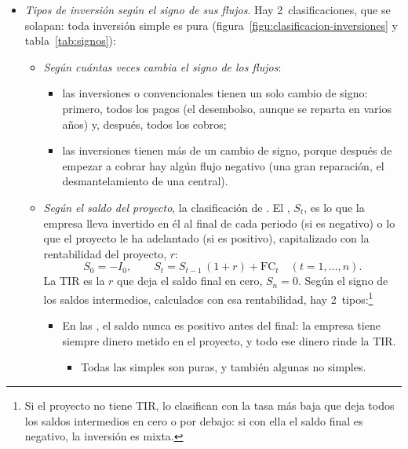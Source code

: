 \documentclass[11pt]{article}
\begin{document}
\begin{infografia}[H]
\centering
\caption{Esquema de pagos de un proyecto de inversión}\label{figu:esquema-pagos}
\end{infografia}

\begin{itemize}
\item \emph{Tipos de inversión según el signo de sus flujos}. Hay 2~clasificaciones, que se solapan: toda inversión simple es pura (figura~\ref{figu:clasificacion-inversiones} y tabla~\ref{tab:signos}):
  \begin{itemize}
  \item \emph{Según cuántas veces cambia el signo de los flujos}:
    \begin{itemize}
    \item las inversiones  o convencionales tienen un solo cambio de signo: primero, todos los pagos (el desembolso, aunque se reparta en varios años) y, después, todos los cobros;
    \item las inversiones  tienen más de un cambio de signo, porque después de empezar a cobrar hay algún flujo negativo (una gran reparación, el desmantelamiento de una central).
    \end{itemize}
  \item \emph{Según el saldo del proyecto}, la clasificación de \textcite{TeichroewRobichekMontalbano1965Analysis}. El , $S_t$, es lo que la empresa lleva invertido en él al final de cada periodo (si es negativo) o lo que el proyecto le ha adelantado (si es positivo), capitalizado con la rentabilidad del proyecto, $r$:
    \[
    S_0=-I_0,\qquad S_t=S_{t-1}\,(1+r)+\mathrm{FC}_t\quad(t=1,\dots,n).
    \]
    La TIR es la $r$ que deja el saldo final en cero, $S_n=0$. Según el signo de los saldos intermedios, calculados con esa rentabilidad, hay 2~tipos:\footnote{Si el proyecto no tiene TIR, \textcite{TeichroewRobichekMontalbano1965Analysis} lo clasifican con la tasa más baja que deja todos los saldos intermedios en cero o por debajo: si con ella el saldo final es negativo, la inversión es mixta.}
    \begin{itemize}
    \item En las , el saldo nunca es positivo antes del final: la empresa tiene siempre dinero metido en el proyecto, y todo ese dinero rinde la TIR.
      \begin{itemize}
      \item Todas las simples son puras, y también algunas no simples.

\end{itemize}
\end{itemize}
\end{itemize}
\end{itemize}
\end{document}
